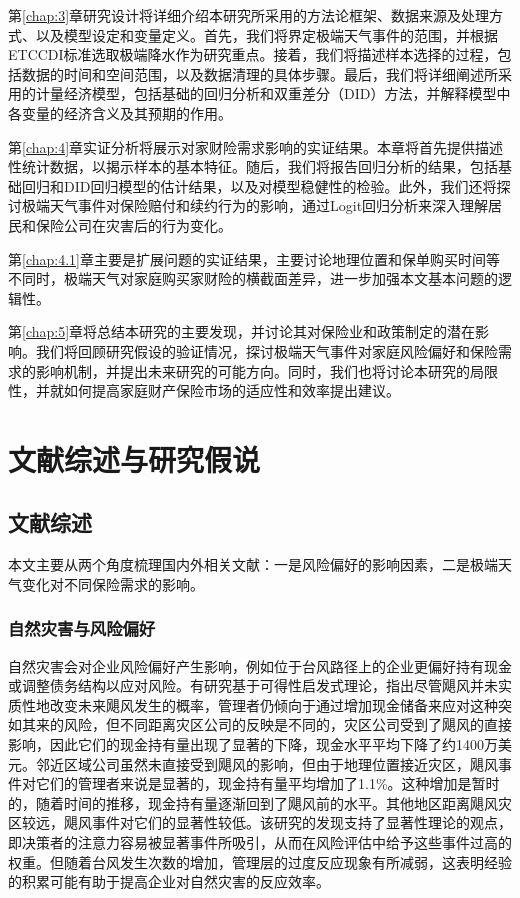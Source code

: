 第\ref{chap:3}章研究设计将详细介绍本研究所采用的方法论框架、数据来源及处理方式、以及模型设定和变量定义。首先，我们将界定极端天气事件的范围，并根据ETCCDI标准选取极端降水作为研究重点。接着，我们将描述样本选择的过程，包括数据的时间和空间范围，以及数据清理的具体步骤。最后，我们将详细阐述所采用的计量经济模型，包括基础的回归分析和双重差分（DID）方法，并解释模型中各变量的经济含义及其预期的作用。

第\ref{chap:4}章实证分析将展示对家财险需求影响的实证结果。本章将首先提供描述性统计数据，以揭示样本的基本特征。随后，我们将报告回归分析的结果，包括基础回归和DID回归模型的估计结果，以及对模型稳健性的检验。此外，我们还将探讨极端天气事件对保险赔付和续约行为的影响，通过Logit回归分析来深入理解居民和保险公司在灾害后的行为变化。

第\ref{chap:4.1}章主要是扩展问题的实证结果，主要讨论地理位置和保单购买时间等不同时，极端天气对家庭购买家财险的横截面差异，进一步加强本文基本问题的逻辑性。

第\ref{chap:5}章将总结本研究的主要发现，并讨论其对保险业和政策制定的潜在影响。我们将回顾研究假设的验证情况，探讨极端天气事件对家庭风险偏好和保险需求的影响机制，并提出未来研究的可能方向。同时，我们也将讨论本研究的局限性，并就如何提高家庭财产保险市场的适应性和效率提出建议。

\chapter{文献综述与研究假说}\label{chap:2}
\section{文献综述}

本文主要从两个角度梳理国内外相关文献：一是风险偏好的影响因素，二是极端天气变化对不同保险需求的影响。

\subsection{自然灾害与风险偏好}

自然灾害会对企业风险偏好产生影响，例如位于台风路径上的企业更偏好持有现金\citep{杨娜娜2019自然灾害与企业现金持有}或调整债务结构\citep{shao2024typhoons}以应对风险。有研究基于可得性启发式理论\citep{0Do}，指出尽管飓风并未实质性地改变未来飓风发生的概率，管理者仍倾向于通过增加现金储备来应对这种突如其来的风险，但不同距离灾区公司的反映是不同的，灾区公司受到了飓风的直接影响，因此它们的现金持有量出现了显著的下降，现金水平平均下降了约1400万美元。邻近区域公司虽然未直接受到飓风的影响，但由于地理位置接近灾区，飓风事件对它们的管理者来说是显著的，现金持有量平均增加了1.1\%。这种增加是暂时的，随着时间的推移，现金持有量逐渐回到了飓风前的水平。其他地区距离飓风灾区较远，飓风事件对它们的显著性较低。该研究的发现支持了显著性理论的观点，即决策者的注意力容易被显著事件所吸引，从而在风险评估中给予这些事件过高的权重。但随着台风发生次数的增加，管理层的过度反应现象有所减弱，这表明经验的积累可能有助于提高企业对自然灾害的反应效率。

